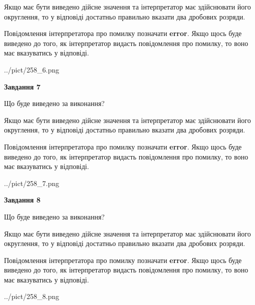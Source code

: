 \documentclass[12pt, ukrainian]{article}
\begin{document}
{\begin {Large}
Якщо має бути виведено дійсне значення та інтерпретатор має здійснювати його округлення, 
то у відповіді достатньо правильно вказати два дробових розряди.

Повідомлення інтерпретатора про помилку позначати \textbf{error}.
Якщо щось буде виведено до того, як інтерпретатор видасть повідомлення про помилку, 
то воно має вказуватись у відповіді. \par

\begin{center}
	{../pict/258_6.png}
\end{center}
\newpage

{\begin {center}\textbf{Завдання 7}\end {center}}\par
Що буде виведено за виконання? \par

Якщо має бути виведено дійсне значення та інтерпретатор має здійснювати його округлення, 
то у відповіді достатньо правильно вказати два дробових розряди.

Повідомлення інтерпретатора про помилку позначати \textbf{error}.
Якщо щось буде виведено до того, як інтерпретатор видасть повідомлення про помилку, 
то воно має вказуватись у відповіді. \par

\begin{center}
	{../pict/258_7.png}
\end{center}
\newpage

{\begin {center}\textbf{Завдання 8}\end {center}}\par
Що буде виведено за виконання? \par

Якщо має бути виведено дійсне значення та інтерпретатор має здійснювати його округлення, 
то у відповіді достатньо правильно вказати два дробових розряди.

Повідомлення інтерпретатора про помилку позначати \textbf{error}.
Якщо щось буде виведено до того, як інтерпретатор видасть повідомлення про помилку, 
то воно має вказуватись у відповіді. \par

\begin{center}
	{../pict/258_8.png}
\end{center}
\newpage


\end{Large}}
\end{document}
